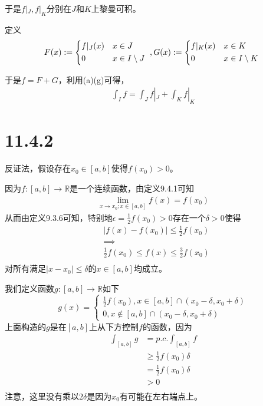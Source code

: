 \documentclass{article}
\begin{document}
\begin{itemize}
        于是$f|_J, f|_K$分别在$J$和$K$上黎曼可积。

        定义
        \begin{equation*}
          F(x) :=
          \begin{cases*}
            f|_J(x) & $x \in J$             \\
            0       & $x \in I \setminus J$
          \end{cases*}
          ,G(x) :=
          \begin{cases*}
            f|_K(x) & $x \in K$             \\
            0       & $x \in I \setminus K$
          \end{cases*}
        \end{equation*}

        于是$f = F + G$，利用(a)(g)可得，
        \begin{align*}
          \int_I f = \int_J f|_J + \int_K f|_K
        \end{align*}
\end{itemize}

\section*{11.4.2}

反证法，假设存在$x_0 \in [a, b]$使得$f(x_0) > 0$。

因为$f: [a, b] \to \mathbb{R}$是一个连续函数，由定义9.4.1可知
\begin{align*}
  \lim\limits_{x \to x_0; x \in [a, b]} f(x)  = f(x_0)
\end{align*}
从而由定义9.3.6可知，特别地$\epsilon = \frac{1}{2}f(x_0) > 0 $存在一个$\delta > 0$使得
\begin{align*}
   & |f(x) - f(x_0)| \leq \frac{1}{2}f(x_0)             \\
   & \implies                                           \\
   & \frac{1}{2}f(x_0) \leq f(x) \leq \frac{3}{2}f(x_0) \\
\end{align*}
对所有满足$|x - x_0| \leq \delta$的$x \in [a, b]$均成立。

我们定义函数$g: [a, b] \to \mathbb{R}$如下
\begin{equation*}
  g(x) =
  \begin{cases*}
    \frac{1}{2}f(x_0), x \in [a,b] \cap (x_0 - \delta, x_0 + \delta) \\
    0, x \notin [a,b] \cap (x_0 - \delta, x_0 + \delta)
  \end{cases*}
\end{equation*}
上面构造的$g$是在$[a, b]$上从下方控制$f$的函数，因为
\begin{align*}
  \int_{[a, b]} g & = p.c.\int_{[a, b]} f         \\
                  & \geq \frac{1}{2}f(x_0) \delta \\
                  & = \frac{1}{2}f(x_0) \delta    \\
                  & > 0                           \\
\end{align*}
注意，这里没有乘以$2\delta$是因为$x_0$有可能在左右端点上。
\end{document}
